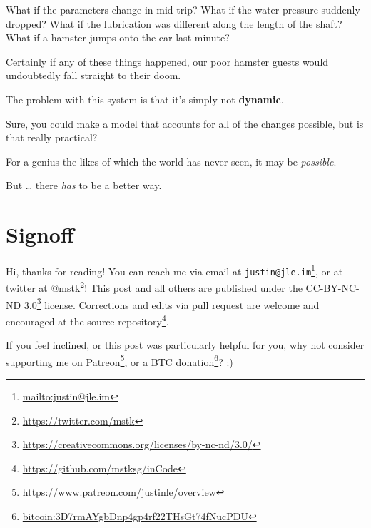 \documentclass[]{article}
\renewcommand{\href}[2]{#2\footnote{\url{#1}}}
\begin{document}
What if the parameters change in mid-trip? What if the water pressure suddenly
dropped? What if the lubrication was different along the length of the shaft?
What if a hamster jumps onto the car last-minute?

Certainly if any of these things happened, our poor hamster guests would
undoubtedly fall straight to their doom.

The problem with this system is that it's simply not \textbf{dynamic}.

Sure, you could make a model that accounts for all of the changes possible, but
is that really practical?

For a genius the likes of which the world has never seen, it may be
\emph{possible}.

But \ldots{} there \emph{has} to be a better way.

\section{Signoff}\label{signoff}

Hi, thanks for reading! You can reach me via email at
\href{mailto:justin@jle.im}{\nolinkurl{justin@jle.im}}, or at twitter at
\href{https://twitter.com/mstk}{@mstk}! This post and all others are published
under the \href{https://creativecommons.org/licenses/by-nc-nd/3.0/}{CC-BY-NC-ND
3.0} license. Corrections and edits via pull request are welcome and encouraged
at \href{https://github.com/mstksg/inCode}{the source repository}.

If you feel inclined, or this post was particularly helpful for you, why not
consider \href{https://www.patreon.com/justinle/overview}{supporting me on
Patreon}, or a \href{bitcoin:3D7rmAYgbDnp4gp4rf22THsGt74fNucPDU}{BTC donation}?
:)
\end{document}

